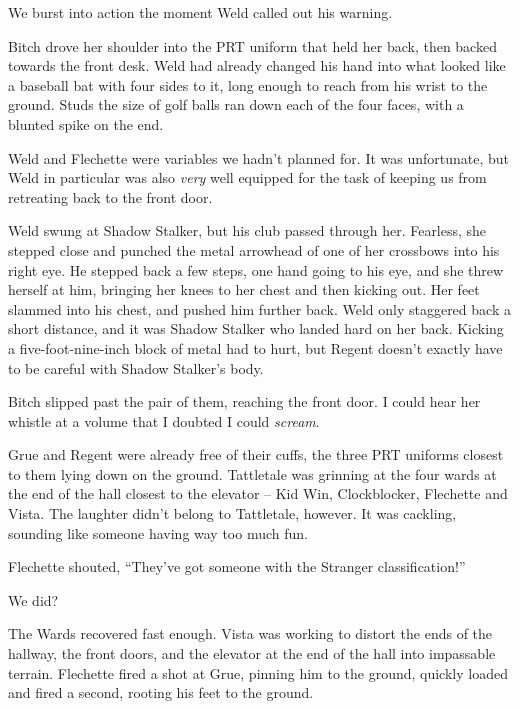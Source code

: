





We burst into action the moment Weld called out his warning.



Bitch drove her shoulder into the PRT uniform that held her back, then backed towards the front desk.  Weld had already changed his hand into what looked like a baseball bat with four sides to it, long enough to reach from his wrist to the ground.  Studs the size of golf balls ran down each of the four faces, with a blunted spike on the end.



Weld and Flechette were variables we hadn't planned for.  It was unfortunate, but Weld in particular was also \emph{very} well equipped for the task of keeping us from retreating back to the front door.



Weld swung at Shadow Stalker, but his club passed through her.  Fearless, she stepped close and punched the metal arrowhead of one of her crossbows into his right eye.  He stepped back a few steps, one hand going to his eye, and she threw herself at him, bringing her knees to her chest and then kicking out.  Her feet slammed into his chest, and pushed him further back.  Weld only staggered back a short distance, and it was Shadow Stalker who landed hard on her back.  Kicking a five-foot-nine-inch block of metal had to hurt, but Regent doesn't exactly have to be careful with Shadow Stalker's body.



Bitch slipped past the pair of them, reaching the front door.  I could hear her whistle at a volume that I doubted I could \emph{scream}.



Grue and Regent were already free of their cuffs, the three PRT uniforms closest to them lying down on the ground.  Tattletale was grinning at the four wards at the end of the hall closest to the elevator – Kid Win, Clockblocker, Flechette and Vista.  The laughter didn't belong to Tattletale, however.  It was cackling, sounding like someone having way too much fun.



Flechette shouted, ``They've got someone with the Stranger classification!''



We did?



The Wards recovered fast enough.  Vista was working to distort the ends of the hallway, the front doors, and the elevator at the end of the hall into impassable terrain.  Flechette fired a shot at Grue, pinning him to the ground, quickly loaded and fired a second, rooting his feet to the ground.



